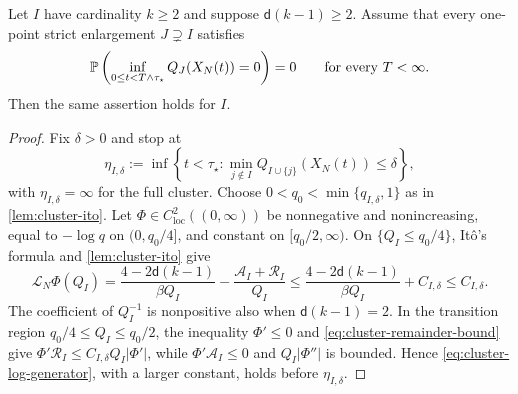 \documentclass[11pt,reqno]{amsart}
\numberwithin{equation}{section}
\theoremstyle{plain}
\theoremstyle{remark}
\renewcommand{\d}{\mathsf{d}}\newcommand{\s}{\mathsf{s}}
\begin{document}
\begin{lemma}\label{lem:cluster-barrier}
Let $I$ have cardinality $k\ge2$ and suppose $\d(k-1)\ge2$. Assume that every one-point strict enlargement $J\supsetneq I$ satisfies
\begin{equation}\label{eq:larger-cluster-induction-hypothesis}
 \mathbb P\left(\inf_{0\le t<T\wedge\tau_\star}Q_J(X_N(t))=0\right)=0
 \qquad\text{for every }T<\infty.
\end{equation}
Then the same assertion holds for $I$.
\end{lemma}
\begin{proof}
Fix $\delta>0$ and stop at
\begin{equation}\label{eq:cluster-exterior-stopping-time}
 \eta_{I,\delta}:=\inf\left\{t<\tau_\star:
 \min_{j\notin I}Q_{I\cup\{j\}}(X_N(t))\le\delta\right\},
\end{equation}
with $\eta_{I,\delta}=\infty$ for the full cluster. Choose $0<q_0<\min\{q_{I,\delta},1\}$ as in \cref{lem:cluster-ito}. Let $\Phi\in C_{\mathrm{loc}}^2((0,\infty))$ be nonnegative and nonincreasing, equal to $-\log q$ on $(0,q_0/4]$, and constant on $[q_0/2,\infty)$. On $\{Q_I\le q_0/4\}$, It\^o's formula and \cref{lem:cluster-ito} give
\begin{equation}\label{eq:cluster-log-generator}
 \mathcal L_N\Phi(Q_I)=\frac{4-2\d(k-1)}{\beta Q_I}-\frac{\mathcal A_I+\mathcal R_I}{Q_I}
 \le\frac{4-2\d(k-1)}{\beta Q_I}+C_{I,\delta}\le C_{I,\delta}.
\end{equation}
The coefficient of $Q_I^{-1}$ is nonpositive also when $\d(k-1)=2$. In the transition region $q_0/4\le Q_I\le q_0/2$, the inequality $\Phi'\le0$ and \eqref{eq:cluster-remainder-bound} give
$\Phi'\mathcal R_I\le C_{I,\delta}Q_I|\Phi'|$, while $\Phi'\mathcal A_I\le0$ and $Q_I|\Phi''|$ is bounded. Hence \eqref{eq:cluster-log-generator}, with a larger constant, holds before $\eta_{I,\delta}$.


\end{proof}
\end{document}
